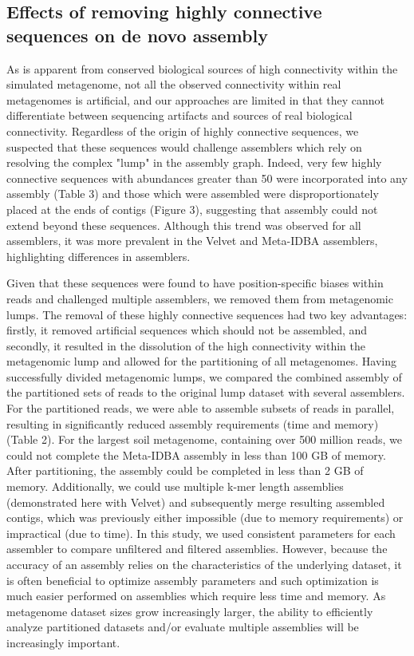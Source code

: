 \documentclass[10pt]{article}
\begin{document}
\subsection*{Effects of removing highly connective sequences on de novo assembly}

As is apparent from conserved biological sources of high connectivity within the simulated metagenome, not all the observed connectivity within real metagenomes is artificial, and our approaches are limited in that they cannot differentiate between sequencing artifacts and sources of real biological connectivity.  Regardless of the origin of highly connective sequences, we suspected that these sequences would challenge assemblers which rely on resolving the complex "lump" in the assembly graph.  Indeed, very few highly connective sequences with abundances greater than 50 were incorporated into any assembly (Table 3) and those which were assembled were disproportionately placed at the ends of contigs (Figure 3), suggesting that assembly could not extend beyond these sequences.  Although this trend was observed for all assemblers, it was more prevalent in the Velvet and Meta-IDBA assemblers, highlighting differences in assemblers.  

Given that these sequences were found to have position-specific biases within reads and challenged multiple assemblers, we removed them from metagenomic lumps.  The removal of these highly connective sequences had two key advantages:  firstly, it removed artificial sequences which should not be assembled, and secondly, it resulted in the dissolution of the high connectivity within the metagenomic lump and allowed for the partitioning of all metagenomes.  Having successfully divided metagenomic lumps, we compared the combined assembly of the partitioned sets of reads to the original lump dataset with several assemblers.  For the partitioned reads, we were able to assemble subsets of reads in parallel, resulting in significantly reduced assembly requirements (time and memory) (Table 2).  For the largest soil metagenome, containing over 500 million reads, we could not complete the Meta-IDBA assembly in less than 100 GB of memory.  After partitioning, the assembly could be completed in less than 2 GB of memory.  Additionally, we could use multiple k-mer length assemblies (demonstrated here with Velvet) and subsequently merge resulting assembled contigs, which was previously either impossible (due to memory requirements) or impractical (due to time).  In this study, we used consistent parameters for each assembler to compare unfiltered and filtered assemblies.  However, because the accuracy of an assembly relies on the characteristics of the underlying dataset, it is often beneficial to optimize assembly parameters and such optimization is much easier performed on assemblies which require less time and memory.  As metagenome dataset sizes grow increasingly larger, the ability to efficiently analyze partitioned datasets and/or evaluate multiple assemblies will be increasingly important.
\end{document}
